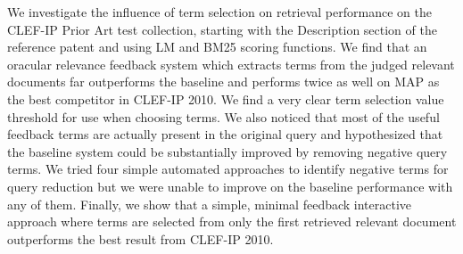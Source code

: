 We investigate the influence of term selection on retrieval
performance on the CLEF-IP Prior Art test collection, starting with
the Description section of the reference patent and using LM and BM25
scoring functions. We find that an oracular relevance feedback system
which extracts terms from the judged relevant documents far
outperforms the baseline and performs twice as well on MAP as the best
competitor in CLEF-IP 2010.  We find a very clear term selection value
threshold for use when choosing terms.  We also noticed that most of
the useful feedback terms are actually present in the original query
and hypothesized that the baseline system could be substantially
improved by removing negative query terms.
We tried four simple automated approaches to identify negative terms
for query reduction but we were unable to improve on the baseline
performance with any of them.  Finally, we show that a simple, minimal
feedback interactive approach where terms are selected from only the
first retrieved relevant document outperforms the best result from
CLEF-IP 2010.

% 
